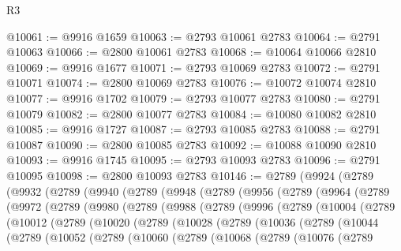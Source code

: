 \begin{lexlean}{R3}
\begin{coremodule}
@10061 := @9916 @1659
@10063 := @2793 @10061 @2783
@10064 := @2791 @10063
@10066 := @2800 @10061 @2783
@10068 := @10064 @10066 @2810
@10069 := @9916 @1677
@10071 := @2793 @10069 @2783
@10072 := @2791 @10071
@10074 := @2800 @10069 @2783
@10076 := @10072 @10074 @2810
@10077 := @9916 @1702
@10079 := @2793 @10077 @2783
@10080 := @2791 @10079
@10082 := @2800 @10077 @2783
@10084 := @10080 @10082 @2810
@10085 := @9916 @1727
@10087 := @2793 @10085 @2783
@10088 := @2791 @10087
@10090 := @2800 @10085 @2783
@10092 := @10088 @10090 @2810
@10093 := @9916 @1745
@10095 := @2793 @10093 @2783
@10096 := @2791 @10095
@10098 := @2800 @10093 @2783
@10146 := @2789
    (@9924
      (@2789
        (@9932
          (@2789
            (@9940
              (@2789
                (@9948
                  (@2789
                    (@9956
                      (@2789
                        (@9964
                          (@2789
                            (@9972
                              (@2789
                                (@9980
                                  (@2789
                                    (@9988
                                      (@2789
                                        (@9996
                                          (@2789
                                            (@10004
                                              (@2789
                                                (@10012
                                                  (@2789
                                                    (@10020
                                                      (@2789
                                                        (@10028
                                                          (@2789
                                                            (@10036
                                                              (@2789
                                                                (@10044
                                                                  (@2789
                                                                    (@10052
                                                                      (@2789
                                                                        (@10060
                                                                          (@2789
                                                                            (@10068
                                                                              (@2789
                                                                                (@10076
                                                                                  (@2789

\end{coremodule}
\end{lexlean}
